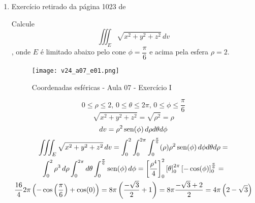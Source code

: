 \begin{enumerate}
	\item Exercício retirado da página 1023 de \cite{James_Stewart_calculo_v2}
	
	Calcule $$\iiint_E \sqrt{x^2 + y^2 + z^2}\, dv$$, onde $E$ é limitado abaixo pelo cone $\phi = \dfrac{\pi}{6}$ e acima pela esfera $\rho = 2$.
	
	\begin{figure}[htb]
		\caption{Coordenadas esféricas - Aula 07 - Exercício I}
		\label{v24_a07_e01}
		\centering
		\texttt{[image: v24\_a07\_e01.png]}		
	\end{figure}
	
	\begin{equation*}
		0 \leq \rho \leq 2,\, 0 \leq \theta \leq 2\pi,\, 0 \leq \phi \leq \dfrac{\pi}{6}
	\end{equation*}
	\begin{equation*}
		\sqrt{x^2 + y^2 + z^2} = \sqrt{\rho^2} = \rho
	\end{equation*}
	\begin{equation*}
		dv = \rho^2\operatorname{sen}(\phi)\, d\rho d\theta d\phi
	\end{equation*}
	\begin{gather*}
		\iiint_E \sqrt{x^2 + y^2 + z^2}\, dv = \int_0^2 \int_0^{2\pi} \int_0^{\frac{\pi}{6}}(\rho)\rho^2\operatorname{sen}(\phi)\, d\phi d\theta d\rho =\\ \int_0^2\rho^3\, d\rho \int_0^{2\pi} d\theta \int_0^{\frac{\pi}{6}}\operatorname{sen}(\phi)\, d\phi = \left[\dfrac{\rho^4}{4}\right]_0^2 \left[\theta\right]_0^{2\pi} \left[-\cos(\phi)\right]_0^{\frac{\pi}{6}} =\\ \dfrac{16}{4}2\pi\left(-\cos\left(\dfrac{\pi}{6}\right) + \cos(0)\right) = 8\pi\left(\dfrac{-\sqrt{3}}{2} +  1\right) = 8\pi \dfrac{-\sqrt{3} + 2}{2} = 4\pi\left(2 - \sqrt{3}\right)
	\end{gather*}
\end{enumerate}